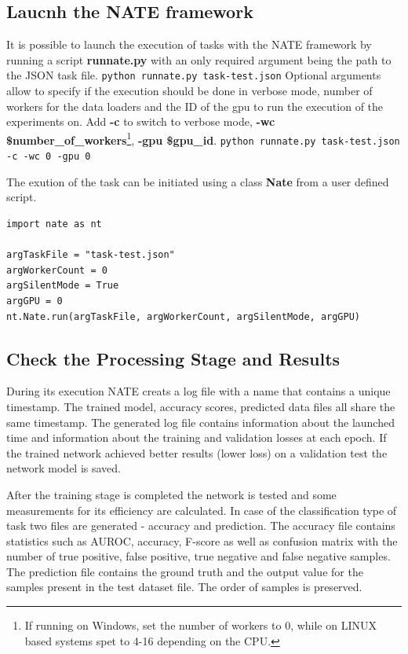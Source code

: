 \documentclass[a4paper, 11pt]{article}
\begin{document}
\subsection{Laucnh the NATE framework}
It is possible to launch the execution of tasks with the NATE framework by running a script \textbf{runnate.py} with an only required argument being the path 
to the JSON task file.
\newline \newline
\texttt{python runnate.py task-test.json}
\newline \newline
Optional arguments allow to specify if the execution should be done in verbose mode, number of workers for the data loaders and the ID of the gpu to run the execution of the experiments on. Add \textbf{-c} to switch to verbose mode, \textbf{-wc \$number\_of\_workers}\footnote{If running on Windows, set the number of workers to 0, while on LINUX based systems spet to 4-16 depending on the CPU.}, \textbf{-gpu \$gpu\_id}.
\newline \newline
\texttt{python runnate.py task-test.json -c -wc 0 -gpu 0}
\newline \newline

The exution of the task can be initiated using a class \textbf{Nate} from a user defined script.

\begin{verbatim}
import nate as nt

argTaskFile = "task-test.json"
argWorkerCount = 0
argSilentMode = True
argGPU = 0
nt.Nate.run(argTaskFile, argWorkerCount, argSilentMode, argGPU)
\end{verbatim}

\subsection{Check the Processing Stage and Results}
During its execution NATE creats a log file with a name that contains a unique timestamp. The trained model, accuracy scores, predicted data files all share the same timestamp. The generated log file contains information about the launched time and information about the training and validation losses at each epoch. If the trained network achieved better results (lower loss) on a validation test the network model is saved.

After the training stage is completed the network is tested and some measurements for its efficiency are calculated. In case of the classification type of task two files are generated - accuracy and prediction. The accuracy file contains statistics such as AUROC, accuracy, F-score as well as confusion matrix with the number of true positive, false positive, true negative and false negative samples. The prediction file contains the ground truth and the output value for the samples present in the test dataset file. The order of samples is preserved.
\end{document}
